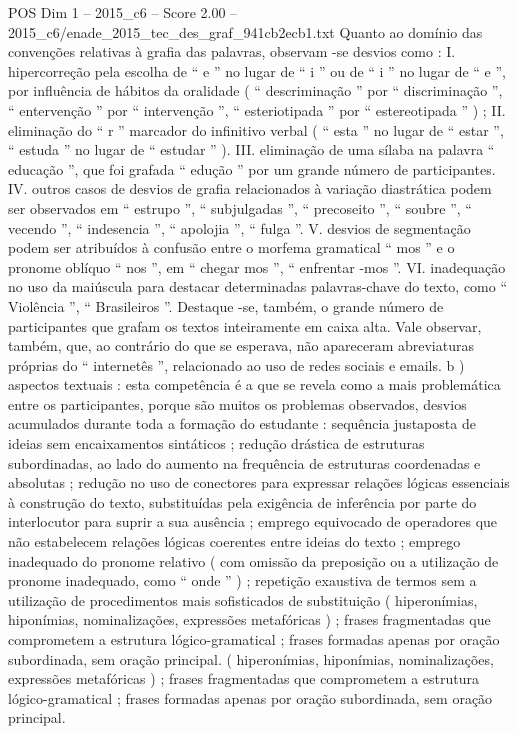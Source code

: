 \begin{textsample}{POS Dim 1 – 2015\_c6 – Score 2.00 – 2015\_c6/enade\_2015\_tec\_des\_graf\_941cb2ecb1.txt}
Quanto ao domínio das convenções relativas à grafia das palavras, observam -se desvios como : I. hipercorreção pela escolha de “ e ” no lugar de “ i ” ou de “ i ” no lugar de “ e ”, por influência de hábitos da oralidade ( “ descriminação ” por “ discriminação ”, “ entervenção ” por “ intervenção ”, “ esteriotipada ” por “ estereotipada ” ) ; II. eliminação do “ r ” marcador do infinitivo verbal ( “ esta ” no lugar de “ estar ”, “ estuda ” no lugar de “ estudar ” ).
III. eliminação de uma sílaba na palavra “ educação ”, que foi grafada “ edução ” por um grande número de participantes.
IV. outros casos de desvios de grafia relacionados à variação diastrática podem ser observados em “ estrupo ”, “ subjulgadas ”, “ precoseito ”, “ soubre ”, “ vecendo ”, “ indesencia ”, “ apolojia ”, “ fulga ”.
V. desvios de segmentação podem ser atribuídos à confusão entre o morfema gramatical “ mos ” e o pronome oblíquo “ nos ”, em “ chegar mos ”, “ enfrentar -mos ”.
VI. inadequação no uso da maiúscula para destacar determinadas palavras-chave do texto, como “ Violência ”, “ Brasileiros ”.
Destaque -se, também, o grande número de participantes que grafam os textos inteiramente em caixa alta.
Vale observar, também, que, ao contrário do que se esperava, não apareceram abreviaturas próprias do “ internetês ”, relacionado ao uso de redes sociais e emails. b ) aspectos textuais : esta competência é a que se revela como a mais problemática entre os participantes, porque são muitos os problemas observados, desvios acumulados durante toda a formação do estudante : sequência justaposta de ideias sem encaixamentos sintáticos ; redução drástica de estruturas subordinadas, ao lado do aumento na frequência de estruturas coordenadas e absolutas ; redução no uso de conectores para expressar relações lógicas essenciais à construção do texto, substituídas pela exigência de inferência por parte do interlocutor para suprir a sua ausência ; emprego equivocado de operadores que não estabelecem relações lógicas coerentes entre ideias do texto ; emprego inadequado do pronome relativo ( com omissão da preposição ou a utilização de pronome inadequado, como “ onde ” ) ; repetição exaustiva de termos sem a utilização de procedimentos mais sofisticados de substituição ( hiperonímias, hiponímias, nominalizações, expressões metafóricas ) ; frases fragmentadas que comprometem a estrutura lógico-gramatical ; frases formadas apenas por oração subordinada, sem oração principal. ( hiperonímias, hiponímias, nominalizações, expressões metafóricas ) ; frases fragmentadas que comprometem a estrutura lógico-gramatical ; frases formadas apenas por oração subordinada, sem oração principal.

\end{textsample}
